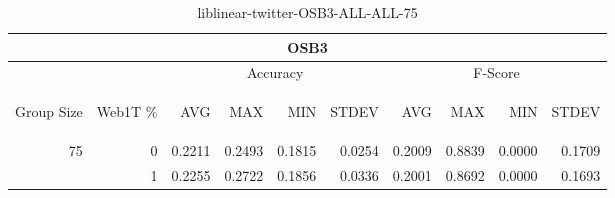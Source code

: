 \begin{center}
\begin{table}[htbp]
\begin{tabular}{ | r | r | r | r | r | r | r | r | r | r |}
\hline
\multicolumn{10}{|c|}{OSB3}\\
\hline
 & & \multicolumn{4}{|c|}{Accuracy} & \multicolumn{4}{|c|}{F-Score}\\ \cline{3-10}
\begin{sideways}Group Size\end{sideways} & \begin{sideways}Web1T \%\end{sideways} & \begin{sideways}AVG\end{sideways} & \begin{sideways}MAX\end{sideways} & \begin{sideways}MIN\end{sideways} & \begin{sideways}STDEV\end{sideways} & \begin{sideways}AVG\end{sideways} & \begin{sideways}MAX\end{sideways} & \begin{sideways}MIN\end{sideways} & \begin{sideways}STDEV\end{sideways}\\
\hline
\multirow{2}{*}{75}
 & 0 & 0.2211 & 0.2493 & 0.1815 & 0.0254 & 0.2009 & 0.8839 & 0.0000 & 0.1709\\ \cline{2-10}
 & 1 & 0.2255 & 0.2722 & 0.1856 & 0.0336 & 0.2001 & 0.8692 & 0.0000 & 0.1693\\ \cline{2-10}
\hline
\end{tabular}
\caption{liblinear-twitter-OSB3-ALL-ALL-75}
\end{table}
\end{center}

